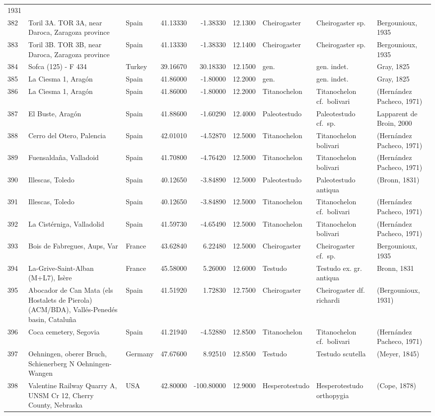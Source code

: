 \documentclass[]{article}
\begin{document}
\begin{longtable}[]{@{}lllrrrlll@{}}
1931\tabularnewline
382 & Toril 3A. TOR 3A, near Daroca, Zaragoza province & Spain &
41.13330 & -1.38330 & 12.1300 & Cheirogaster & Cheirogaster sp. &
Bergounioux, 1935\tabularnewline
383 & Toril 3B. TOR 3B, near Daroca, Zaragoza province & Spain &
41.13330 & -1.38330 & 12.1400 & Cheirogaster & Cheirogaster sp. &
Bergounioux, 1935\tabularnewline
384 & Sofca (125) - F 434 & Turkey & 39.16670 & 30.18330 & 12.1500 &
gen. & gen. indet. & Gray, 1825\tabularnewline
385 & La Ciesma 1, Aragón & Spain & 41.86000 & -1.80000 & 12.2000 & gen.
& gen. indet. & Gray, 1825\tabularnewline
386 & La Ciesma 1, Aragón & Spain & 41.86000 & -1.80000 & 12.2000 &
Titanochelon & Titanochelon cf.~bolivari & (Hernández Pacheco,
1971)\tabularnewline
387 & El Buste, Aragón & Spain & 41.88600 & -1.60290 & 12.4000 &
Paleotestudo & Paleotestudo cf.~sp. & Lapparent de Broin,
2000\tabularnewline
388 & Cerro del Otero, Palencia & Spain & 42.01010 & -4.52870 & 12.5000
& Titanochelon & Titanochelon bolivari & (Hernández Pacheco,
1971)\tabularnewline
389 & Fuensaldaña, Valladoid & Spain & 41.70800 & -4.76420 & 12.5000 &
Titanochelon & Titanochelon bolivari & (Hernández Pacheco,
1971)\tabularnewline
390 & Illescas, Toledo & Spain & 40.12650 & -3.84890 & 12.5000 &
Paleotestudo & Paleotestudo antiqua & (Bronn, 1831)\tabularnewline
391 & Illescas, Toledo & Spain & 40.12650 & -3.84890 & 12.5000 &
Titanochelon & Titanochelon cf.~bolivari & (Hernández Pacheco,
1971)\tabularnewline
392 & La Cistérniga, Valladolid & Spain & 41.59730 & -4.65490 & 12.5000
& Titanochelon & Titanochelon bolivari & (Hernández Pacheco,
1971)\tabularnewline
393 & Bois de Fabregues, Aups, Var & France & 43.62840 & 6.22480 &
12.5000 & Cheirogaster & Cheirogaster cf.~sp. & Bergounioux,
1935\tabularnewline
394 & La-Grive-Saint-Alban (M+L7), Isère & France & 45.58000 & 5.26000 &
12.6000 & Testudo & Testudo ex. gr. antiqua & Bronn, 1831\tabularnewline
395 & Abocador de Can Mata (els Hostalets de Pierola)(ACM/BDA),
Vallés-Penedés basin, Cataluña & Spain & 41.51920 & 1.72830 & 12.7500 &
Cheirogaster & Cheirogaster df. richardi & (Bergounioux,
1931)\tabularnewline
396 & Coca cemetery, Segovia & Spain & 41.21940 & -4.52880 & 12.8500 &
Titanochelon & Titanochelon cf.~bolivari & (Hernández Pacheco,
1971)\tabularnewline
397 & Oehningen, oberer Bruch, Schienerberg N Oehningen-Wangen & Germany
& 47.67600 & 8.92510 & 12.8500 & Testudo & Testudo scutella & (Meyer,
1845)\tabularnewline
398 & Valentine Railway Quarry A, UNSM Cr 12, Cherry County, Nebraska &
USA & 42.80000 & -100.80000 & 12.9000 & Hesperotestudo & Hesperotestudo
orthopygia & (Cope, 1878)\tabularnewline

\end{longtable}
\end{document}
